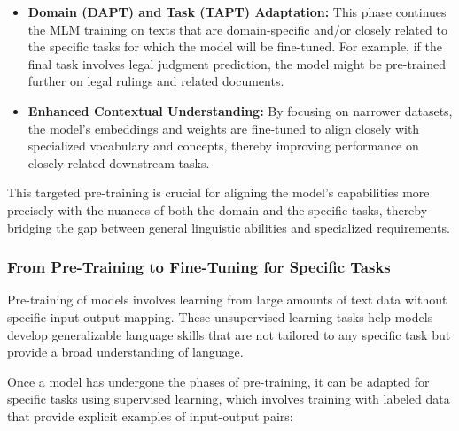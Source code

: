 \documentclass[12pt]{article}
\begin{document}
\begin{itemize}
    \item \textbf{Domain (DAPT) and Task (TAPT) Adaptation:} This phase continues the MLM training on texts that are domain-specific and/or closely related to the specific tasks for which the model will be fine-tuned. For example, if the final task involves legal judgment prediction, the model might be pre-trained further on legal rulings and related documents.
    \item \textbf{Enhanced Contextual Understanding:} By focusing on narrower datasets, the model's embeddings and weights are fine-tuned to align closely with specialized vocabulary and concepts, thereby improving performance on closely related downstream tasks.
\end{itemize}
This targeted pre-training is crucial for aligning the model's capabilities more precisely with the nuances of both the domain and the specific tasks, thereby bridging the gap between general linguistic abilities and specialized requirements.

\subsubsection{From Pre-Training to Fine-Tuning for Specific Tasks}

Pre-training of models involves learning from large amounts of text data without specific input-output mapping. These unsupervised learning tasks help models develop generalizable language skills that are not tailored to any specific task but provide a broad understanding of language.

Once a model has undergone the phases of pre-training, it can be adapted for specific tasks using supervised learning, which involves training with labeled data that provide explicit examples of input-output pairs:
\end{document}
